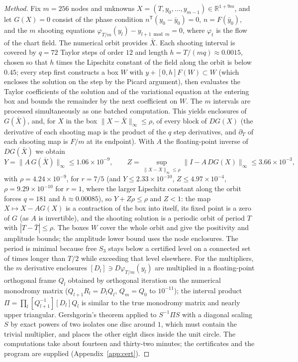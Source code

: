 \documentclass[11pt,a4paper]{article}
\theoremstyle{plain}
\theoremstyle{definition}
\theoremstyle{remark}
\newcommand{\R}{\mathbb R}
\newcommand{\T}{\mathsf T}
\begin{document}
\begin{proof}[Method]
Fix $m=256$ nodes and unknowns $X=(T,y_0,\dots,y_{m-1})\in\R^{1+9m}$, and let $G(X)=0$ consist of the phase condition $n^{\T}(y_0-\bar y_0)=0$, $n=F(\bar y_0)$, and the $m$ shooting equations $\varphi_{T/m}(y_l)-y_{l+1\bmod m}=0$, where $\varphi_t$ is the flow of the chart field. The numerical orbit provides $\bar X$. Each shooting interval is covered by $q=72$ Taylor steps of order $12$ and length $h=T/(mq)\approx0.0015$, chosen so that $h$ times the Lipschitz constant of the field along the orbit is below $0.45$; every step first constructs a box $W$ with $y+[0,h]F(W)\subset W$ (which encloses the solution on the step by the Picard argument), then evaluates the Taylor coefficients of the solution and of the variational equation at the entering box and bounds the remainder by the next coefficient on $W$. The $m$ intervals are processed simultaneously as one batched computation. This yields enclosures of $G(\bar X)$, and, for $X$ in the box $\|X-\bar X\|_\infty\le\rho$, of every block of $DG(X)$ (the derivative of each shooting map is the product of the $q$ step derivatives, and $\partial_T$ of each shooting map is $F/m$ at its endpoint). With $A$ the floating-point inverse of $DG(\bar X)$ we obtain
\[
 Y=\|A\,G(\bar X)\|_\infty\le1.06\times10^{-9},\qquad Z=\sup_{\|X-\bar X\|_\infty\le\rho}\|I-A\,DG(X)\|_\infty\le3.66\times10^{-3},
\]
with $\rho=4.24\times10^{-9}$,
for $r=7/5$ (and $Y\le2.33\times10^{-10}$, $Z\le4.97\times10^{-4}$, $\rho=9.29\times10^{-10}$ for $r=1$, where the larger Lipschitz constant along the orbit forces $q=181$ and $h\approx0.00085$), so $Y+Z\rho\le\rho$ and $Z<1$: the map $X\mapsto X-AG(X)$ is a contraction of the box into itself, its fixed point is a zero of $G$ (as $A$ is invertible), and the shooting solution is a periodic orbit of period $T$ with $|T-\bar T|\le\rho$. The boxes $W$ cover the whole orbit and give the positivity and amplitude bounds; the amplitude lower bound uses the node enclosures. The period is minimal because free $S_3$ stays below a certified level on a connected set of times longer than $T/2$ while exceeding that level elsewhere. For the multipliers, the $m$ derivative enclosures $[D_l]\ni D\varphi_{T/m}(y_l)$ are multiplied in a floating-point orthogonal frame $Q_l$ obtained by orthogonal iteration on the numerical monodromy matrix ($Q_{l+1}R_l=D_lQ_l$, $Q_m=Q_0$ to $10^{-11}$); the interval product $\Pi=\prod_l[Q_{l+1}^{-1}][D_l]Q_l$ is similar to the true monodromy matrix and nearly upper triangular. Gershgorin's theorem applied to $S^{-1}\Pi S$ with a diagonal scaling $S$ by exact powers of two isolates one disc around $1$, which must contain the trivial multiplier, and places the other eight discs inside the unit circle. The computations take about fourteen and thirty-two minutes; the certificates and the program are supplied (Appendix~\ref{app:cert}).
\end{proof}
\end{document}
